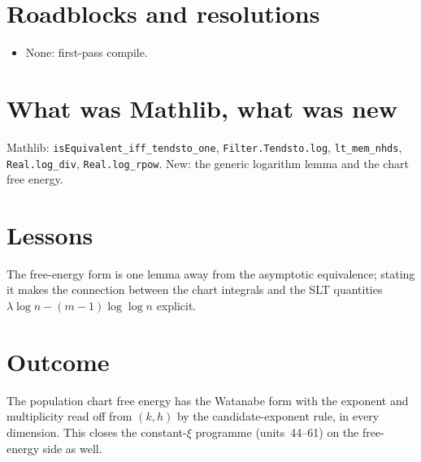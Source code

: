 \documentclass[11pt]{article}
\begin{document}
\section{Roadblocks and resolutions}
\begin{itemize}
\item None: first-pass compile.
\end{itemize}

\section{What was Mathlib, what was new}
Mathlib: \texttt{isEquivalent\_iff\_tendsto\_one}, \texttt{Filter.Tendsto.log}, \texttt{lt\_mem\_nhds},
\texttt{Real.log\_div}, \texttt{Real.log\_rpow}. New: the generic logarithm lemma and the chart free
energy.

\section{Lessons}
The free-energy form is one lemma away from the asymptotic equivalence; stating it makes the
connection between the chart integrals and the SLT quantities $\lambda\log n-(m-1)\log\log n$ explicit.

\section{Outcome}
The population chart free energy has the Watanabe form with the exponent and multiplicity read off
from $(k,h)$ by the candidate-exponent rule, in every dimension. This closes the constant-$\xi$
programme (units~44--61) on the free-energy side as well.
\end{document}
